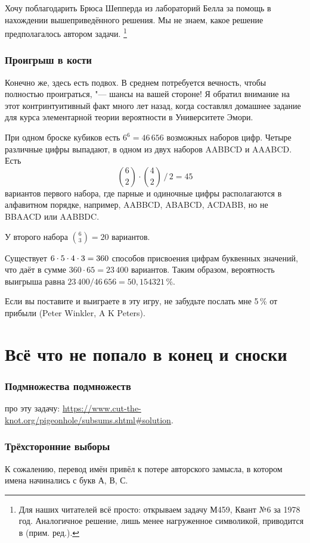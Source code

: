 \documentclass[twoside]{book}
\begin{document}
Хочу поблагодарить Брюса Шепперда %
из лабораторий Белла %
за помощь в нахождении вышеприведённого решения.
Мы не знаем, какое решение предполагалось автором задачи.%
\footnote{Для наших читателей всё просто: открываем задачу М459, Квант №6 за 1978 год.
Аналогичное решение, лишь менее нагруженное символикой, приводится в \cite[№240]{ВсМО} (прим. ред.). }

\subsubsection*{Проигрыш в кости}%

Конечно же, здесь есть подвох.
В среднем потребуется вечность, чтобы полностью проиграться, "--- шансы на вашей стороне! 
Я обратил внимание на этот контринтуитивный факт много лет назад, когда составлял домашнее задание для курса элементарной теории вероятности в Университете Эмори.

При одном броске кубиков есть $6^6 =46\,656$ возможных наборов цифр.
Четыре различные цифры выпадают, в одном из двух наборов AABBCD и AAABCD.
Есть
\[\binom62\cdot\binom42\,\big/\,2=45\]
вариантов первого набора, где парные и одиночные цифры располагаются в алфавитном порядке, например, AABBCD, ABABCD, ACDABB, но не BBAACD или AABBDC.

У второго набора $\binom63=20$  вариантов.

Существует $6\cdot 5\cdot 4\cdot 3\z=360$ способов присвоения цифрам буквенных значений, что даёт в сумме $360\cdot 65=23\,400$ вариантов.
Таким образом, вероятность выигрыша равна
$23\,400/46\,656 = 50{,}154321\,\%$.
\heart

Если вы поставите и выиграете в эту игру, не забудьте послать мне 5\,\% от прибыли 
(Peter Winkler,  A  K Peters).

\section*{Всё что не попало в конец и сноски}

\subsubsection*{Подмножества подмножеств}
 про эту задачу: \url{https://www.cut-the-knot.org/pigeonhole/subsums.shtml#solution}.

\subsubsection{Трёхсторонние выборы}
К сожалению, перевод имён привёл к потере авторского замысла, в котором имена начинались с букв А, В, С.
\end{document}
